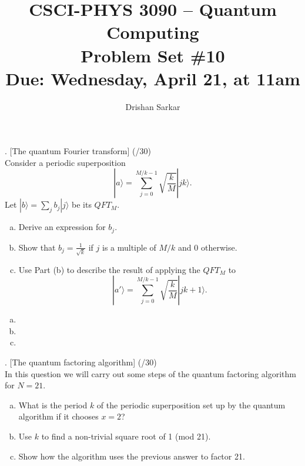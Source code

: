 \documentclass[11pt]{article}
\newenvironment{solution}{\begin{mdframed}[skipabove=\baselineskip,innertopmargin=\baselineskip,innerbottommargin=\baselineskip]
  }{\end{mdframed}}
\begin{document}
\date{}
\author{Drishan Sarkar}
\title{CSCI-PHYS 3090 -- Quantum Computing \\ Problem Set \#10 \\ Due: Wednesday, April 21, at 11am}
\maketitle

. [The quantum Fourier transform] (/30)
\\
Consider a periodic superposition
$$|a\rangle=\sum_{j=0}^{M/k-1}\sqrt{\frac{k}{M}}|jk\rangle.$$
Let $|b\rangle=\sum_jb_j|j\rangle$ be its $QFT_M$.

\begin{enumerate}[(a)]
    \item Derive an expression for $b_j$.
    \item Show that $b_j = \frac{1}{\sqrt{k}}$ if $j$ is a multiple of $M/k$ and 0 otherwise.
    \item Use Part (b) to describe the result of applying the $QFT_M$ to 
    $$|a'\rangle=\sum_{j=0}^{M/k-1}\sqrt{\frac{k}{M}}|jk+1\rangle.$$
\end{enumerate}

\begin{solution}
\begin{enumerate}[(a)]
    \item %
    \item
    \item 
\end{enumerate}
\end{solution}

\newpage

. [The quantum factoring algorithm] (/30)
\\
In this question we will carry out some steps of the quantum factoring algorithm for $N = 21$.

\begin{enumerate}[(a)] 
    \item What is the period $k$ of the periodic superposition set up by the quantum algorithm if it chooses $x= 2$?
    \item Use $k$ to find a non-trivial square root of 1 (mod 21).
    \item Show how the algorithm uses the previous answer to factor 21.
\end{enumerate}
\end{document}
